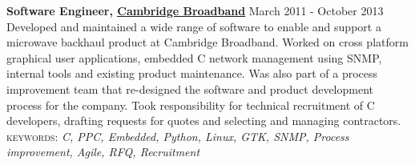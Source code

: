 \documentclass[10pt]{article}
\newcommand{\linkto}[2]{\href{#1}{\color{darkblue}\setulcolor{darkblue}\ul{#2}}}
\newcommand{\blankline}{\quad\pagebreak[2]}
\begin{document}




\textbf{Software Engineer, \linkto{http://cbnl.com}{Cambridge Broadband} } \hfill March 2011 - October 2013 \\
Developed and maintained a wide range of software to enable and support a microwave backhaul product at Cambridge Broadband. Worked on cross platform graphical user applications, embedded C network management using SNMP, internal tools and existing product maintenance. Was also part of a process improvement team that re-designed the software and product development process for the company. Took responsibility for technical recruitment of C developers, drafting requests for quotes and selecting and managing contractors.  \\
{\small\textsc{keywords:} \emph{C, PPC, Embedded, Python, Linux, GTK, SNMP, Process improvement, Agile, RFQ, Recruitment}}

\blankline



\end{document}
